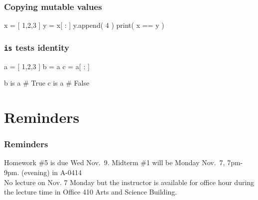 \documentclass[11pt]{beamer}
\begin{document}
\begin{frame}[fragile]
  \frametitle{Copying mutable values}
  \Enlarge

  \begin{semiverbatim}
x = [ 1,2,3 ]
y = x[ : ]
y.append( 4 )
print( x == y )
  \end{semiverbatim}
\end{frame}

\begin{frame}[fragile]
  \frametitle{\texttt{is} tests identity}
  \Enlarge

  \begin{semiverbatim}
a = [ 1,2,3 ]
b = a
c = a[ : ]

b is a  # True
c is a  # False
  \end{semiverbatim}
\end{frame}

\section{Reminders}

\begin{frame}
  \frametitle{Reminders}
  \Enlarge

  \begin{itemize}
  	\myitem  Homework \#5 is due Wed Nov.\ 9.
  	\myitem  Midterm \#1 will be Monday Nov.\ 7, 7pm-9pm.  (evening) in A-0414\\ \textcolor{CS101GradBot}{No lecture on Nov. 7 Monday but the instructor is available for office hour during the lecture time in Office 410 Arts and Science Building.}
  \end{itemize}
\end{frame}
\end{document}
